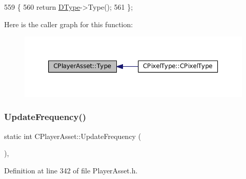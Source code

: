 \begin{DoxyCode}
559                                \{
560             \textcolor{keywordflow}{return} \hyperlink{classCPlayerAsset_a5d61f73471e1e6f0a6ab15f2ffa7b359}{DType}->Type();  
561         \};
\end{DoxyCode}
Here is the caller graph for this function\+:
\nopagebreak
\begin{figure}[H]
\begin{center}
\leavevmode
\includegraphics[width=350pt]{classCPlayerAsset_a6d6aeea4e8b02e0f239bac95db6d9e0a_icgraph}
\end{center}
\end{figure}
\hypertarget{classCPlayerAsset_a0aff85b9552967a42f4f3f42cb59c19f}{}\label{classCPlayerAsset_a0aff85b9552967a42f4f3f42cb59c19f} 
\subsubsection{\texorpdfstring{Update\+Frequency()}{UpdateFrequency()}\hspace{0.1cm}{\footnotesize\ttfamily [1/2]}}
{\footnotesize\ttfamily static int C\+Player\+Asset\+::\+Update\+Frequency (\begin{DoxyParamCaption}{ }\end{DoxyParamCaption})\hspace{0.3cm}{\ttfamily [inline]}, {\ttfamily [static]}}



Definition at line 342 of file Player\+Asset.\+h.


